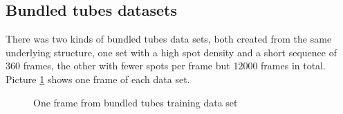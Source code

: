 \subsection{Bundled tubes datasets}
There was two kinds of bundled tubes data sets, both created from the same underlying structure, one set with a high spot density and a short sequence of 360 frames, the other with fewer spots per frame but 12000 frames in total. Picture \ref{bundledtubesHighowDensityFrame} shows one frame of each data set.\newline
\begin{figure}
\begin{minipage}[t]{0.60\textwidth}
\hfill
{}
	\caption{One frame from bundled tubes training data set}
	\label{bundledtubesHighowDensityFrame}	
\end{minipage}\hfill
\begin{minipage}[t]{0.33\textwidth}
\centering

\end{minipage}
\end{figure}

